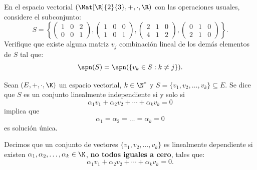 \documentclass[compacto,10pt]{pubciencias-notas}
\begin{document}
\begin{ejer}
En el espacio vectorial $(\Mat[\R]{2}{3},+,\cdot,\R)$ con las operaciones usuales, considere el subconjunto:
\[S=\left\lbrace \begin{pmatrix} 1 & 0 & 2\\ 0 & 0 & 1 \end{pmatrix}, \begin{pmatrix} 1 & 0 & 0\\ 1 & 0 & 1 \end{pmatrix}, \begin{pmatrix} 2 & 1 & 0\\ 4 & 1 & 2 \end{pmatrix}, \begin{pmatrix} 0 & 1 & 0\\ 2 & 1 & 0 \end{pmatrix} \right\rbrace.\]
Verifique que existe alguna matriz $v_j$ combinación lineal de los demás elementos de $S$ tal que:
\[
    \spn(S) = \spn(\{v_{k}\in S: k\neq j\}).
\]
\end{ejer}


\begin{defi}
    Sean $(E,+,\cdot,\K)$ un espacio vectorial, $k\in\N^{*}$ y $S=\{v_1,v_2,\ldots,v_k\}\subseteq E$. Se dice que $S$ es un conjunto linealmente independiente si y solo si
    \[ \alpha_1 v_1 + \alpha_2 v_2 + \cdots + \alpha_k v_k = 0 \]
    implica que 
    \[ \alpha_1=\alpha_2=\ldots= \alpha_k=0 \]
    es solución única.
\end{defi}
\begin{advertencia}
    Decimos que un conjunto de vectores $\{v_1,v_2,\ldots,v_k\}$ es linealmente dependiente si existen $\alpha_1, \alpha_2, \ldots, \alpha_k \in \K$, \textbf{no todos iguales a cero}, tales que:
    \[
        \alpha_1 v_1 + \alpha_2 v_2 + \cdots + \alpha_k v_k = 0.
    \]
\end{advertencia}

\end{document}

